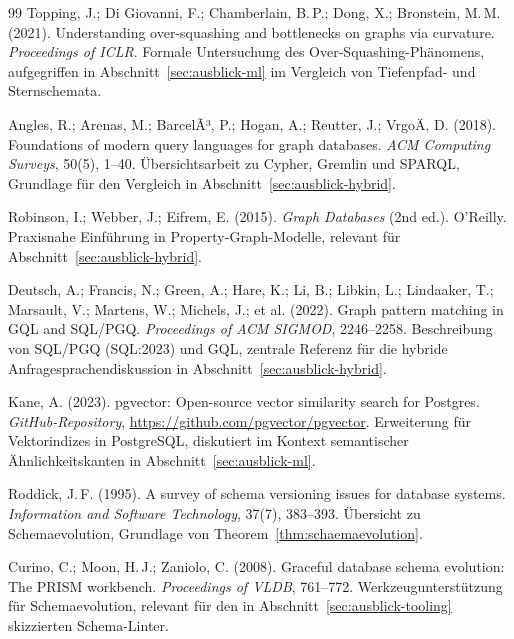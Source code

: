 ﻿\documentclass[a4paper,12pt]{report}
\theoremstyle{definition}
\theoremstyle{remark}
\begin{document}
\begin{thebibliography}{99}
Topping, J.; Di Giovanni, F.; Chamberlain, B.\,P.; Dong, X.;
Bronstein, M.\,M. (2021).
\newblock Understanding over-squashing and bottlenecks on graphs via
curvature.
\newblock \emph{Proceedings of ICLR}.
\newblock Formale Untersuchung des Over-Squashing-Phänomens,
aufgegriffen in Abschnitt~\ref{sec:ausblick-ml} im Vergleich von
Tiefenpfad- und Sternschemata.

Angles, R.; Arenas, M.; BarcelÃ³, P.; Hogan, A.; Reutter, J.;
VrgoÄ, D. (2018).
\newblock Foundations of modern query languages for graph databases.
\newblock \emph{ACM Computing Surveys}, 50(5), 1--40.
\newblock Übersichtsarbeit zu Cypher, Gremlin und SPARQL, Grundlage
für den Vergleich in Abschnitt~\ref{sec:ausblick-hybrid}.

Robinson, I.; Webber, J.; Eifrem, E. (2015).
\newblock \emph{Graph Databases} (2nd ed.).
\newblock O'Reilly.
\newblock Praxisnahe Einführung in Property-Graph-Modelle, relevant
für Abschnitt~\ref{sec:ausblick-hybrid}.

Deutsch, A.; Francis, N.; Green, A.; Hare, K.; Li, B.; Libkin, L.;
Lindaaker, T.; Marsault, V.; Martens, W.; Michels, J.; et al. (2022).
\newblock Graph pattern matching in GQL and SQL/PGQ.
\newblock \emph{Proceedings of ACM SIGMOD}, 2246--2258.
\newblock Beschreibung von SQL/PGQ (SQL:2023) und GQL, zentrale
Referenz für die hybride Anfragesprachendiskussion in
Abschnitt~\ref{sec:ausblick-hybrid}.

Kane, A. (2023).
\newblock pgvector: Open-source vector similarity search for Postgres.
\newblock \emph{GitHub-Repository}, \url{https://github.com/pgvector/pgvector}.
\newblock Erweiterung für Vektorindizes in PostgreSQL, diskutiert im
Kontext semantischer Ähnlichkeitskanten in
Abschnitt~\ref{sec:ausblick-ml}.

Roddick, J.\,F. (1995).
\newblock A survey of schema versioning issues for database systems.
\newblock \emph{Information and Software Technology}, 37(7), 383--393.
\newblock Übersicht zu Schemaevolution, Grundlage von
Theorem~\ref{thm:schaemaevolution}.

Curino, C.; Moon, H.\,J.; Zaniolo, C. (2008).
\newblock Graceful database schema evolution: The PRISM workbench.
\newblock \emph{Proceedings of VLDB}, 761--772.
\newblock Werkzeugunterstützung für Schemaevolution, relevant für den
in Abschnitt~\ref{sec:ausblick-tooling} skizzierten Schema-Linter.


\end{thebibliography}
\end{document}
